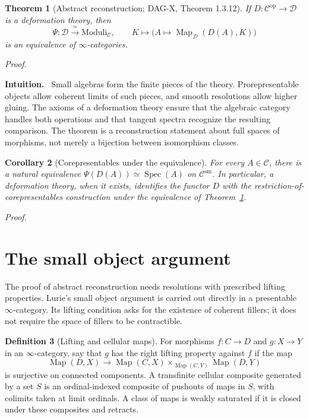 \documentclass[12pt,letterpaper,oneside]{report}
\newtheorem{theorem}{Theorem}[section]
\newtheorem{corollary}[theorem]{Corollary}
\theoremstyle{definition}
\newtheorem{definition}[theorem]{Definition}
\theoremstyle{remark}
\renewenvironment{proof}[1][Proof]{\par\nopagebreak[4]\addvspace{4pt}\noindent\textit{#1.}\par\nobreak\vspace{0.5\baselineskip}}{\par\addvspace{4pt}}
\newenvironment{intuition}{\par\noindent\textbf{Intuition.}\ }{\par}
\newcommand{\cC}{\mathcal C}
\newcommand{\cD}{\mathcal D}
\newcommand{\FMP}{\mathrm{Moduli}}
\newcommand{\Map}{\operatorname{Map}}
\newcommand{\Spec}{\operatorname{Spec}}
\newcommand{\op}{\mathrm{op}}
\newcommand{\sm}{\mathrm{sm}}
\begin{document}
\begin{theorem}[Abstract reconstruction; DAG-X, Theorem 1.3.12]
\label{thm:abstract}
If $D:\cC^{\op}\to\cD$ is a deformation theory, then
\[
 \Psi:\cD\xrightarrow{\ \simeq\ }\FMP_{\cC},\qquad
 K\longmapsto\bigl(A\longmapsto\Map_{\cD}(D(A),K)\bigr)
\]
is an equivalence of $\infty$-categories.
\end{theorem}
\begin{proof}
\end{proof}

\begin{intuition}
Small algebras form the finite pieces of the theory. Prorepresentable objects allow coherent limits of such pieces, and smooth resolutions allow higher gluing. The axioms of a deformation theory ensure that the algebraic category handles both operations and that tangent spectra recognize the resulting comparison. The theorem is a reconstruction statement about full spaces of morphisms, not merely a bijection between isomorphism classes.
\end{intuition}

\begin{corollary}[Corepresentables under the equivalence]
For every $A\in\cC$, there is a natural equivalence $\Psi(D(A))\simeq\Spec(A)$ on $\cC^{\sm}$. In particular, a deformation theory, when it exists, identifies the functor $D$ with the restriction-of-corepresentables construction under the equivalence of Theorem~\ref{thm:abstract}.
\end{corollary}
\begin{proof}
\end{proof}


\section{The small object argument}
\label{sec:small-object}

The proof of abstract reconstruction needs resolutions with prescribed lifting properties. Lurie's small object argument is carried out directly in a presentable $\infty$-category. Its lifting condition asks for the existence of coherent fillers; it does not require the space of fillers to be contractible.

\begin{definition}[Lifting and cellular maps]
For morphisms $f:C\to D$ and $g:X\to Y$ in an $\infty$-category, say that $g$ has the right lifting property against $f$ if the map
\[
 \Map(D,X)\longrightarrow
 \Map(C,X)\mathbin{\times}_{\Map(C,Y)}\Map(D,Y)
\]
is surjective on connected components. A transfinite cellular composite generated by a set $S$ is an ordinal-indexed composite of pushouts of maps in $S$, with colimits taken at limit ordinals. A class of maps is weakly saturated if it is closed under these composites and retracts.
\end{definition}
\end{document}

